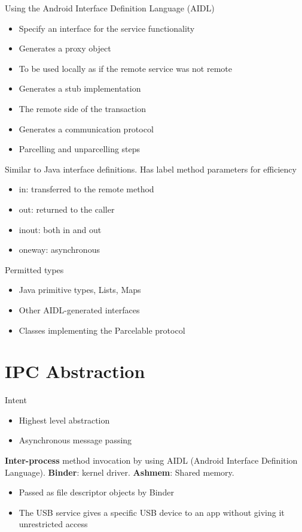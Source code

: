 \documentclass{article}
\begin{document}
\begin{flushleft}
Using the Android Interface Definition Language (AIDL)
\begin{itemize}
  \item Specify an interface for the service functionality
  \item Generates a proxy object
  \item To be used locally as if the remote service was not remote
  \item Generates a stub implementation 
  \item The remote side of the transaction
  \item Generates a communication protocol
  \item Parcelling and unparcelling steps
\end{itemize}
Similar to Java interface definitions. Has label method parameters for efficiency
\begin{itemize}
  \item in: transferred to the remote method
  \item out: returned to the caller
  \item inout: both in and out
  \item oneway: asynchronous
\end{itemize}
Permitted types
\begin{itemize}
  \item Java primitive types, Lists, Maps
  \item Other AIDL-generated interfaces
  \item Classes implementing the Parcelable protocol
\end{itemize}
\end{flushleft}

\section{IPC Abstraction}

\begin{flushleft}
Intent
\begin{itemize}
  \item Highest level abstraction
  \item Asynchronous message passing
\end{itemize}
\textbf{Inter-process} method invocation by using AIDL (Android Interface Definition Language). \textbf{Binder}: kernel driver. \textbf{Ashmem}: Shared memory.
\begin{itemize}
  \item Passed as file descriptor objects by Binder
  \item The USB service gives a specific USB device to an app without giving it unrestricted access
\end{itemize}
\end{flushleft}
\end{document}
